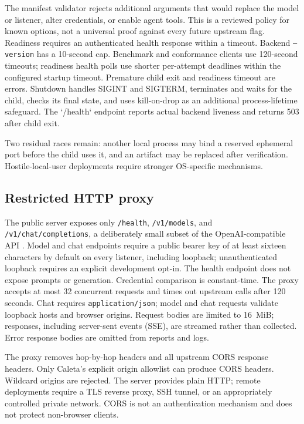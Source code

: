 \documentclass[11pt,a4paper]{article}
\begin{document}
The manifest validator rejects additional arguments that would replace the model or listener, alter credentials, or enable agent tools. This is a reviewed policy for known options, not a universal proof against every future upstream flag. Readiness requires an authenticated health response within a timeout. Backend \texttt{--version} has a 10-second cap. Benchmark and conformance clients use 120-second timeouts; readiness health polls use shorter per-attempt deadlines within the configured startup timeout. Premature child exit and readiness timeout are errors. Shutdown handles SIGINT and SIGTERM, terminates and waits for the child, checks its final state, and uses kill-on-drop as an additional process-lifetime safeguard. The `/health` endpoint reports actual backend liveness and returns 503 after child exit.

Two residual races remain: another local process may bind a reserved ephemeral port before the child uses it, and an artifact may be replaced after verification. Hostile-local-user deployments require stronger OS-specific mechanisms.

\subsection{Restricted HTTP proxy}

The public server exposes only \texttt{/health}, \texttt{/v1/models}, and \texttt{/v1/chat/completions}, a deliberately small subset of the OpenAI-compatible API \cite{openai}. Model and chat endpoints require a public bearer key of at least sixteen characters by default on every listener, including loopback; unauthenticated loopback requires an explicit development opt-in. The health endpoint does not expose prompts or generation. Credential comparison is constant-time. The proxy accepts at most 32 concurrent requests and times out upstream calls after 120 seconds. Chat requires \texttt{application/json}; model and chat requests validate loopback hosts and browser origins. Request bodies are limited to 16~MiB; responses, including server-sent events (SSE), are streamed rather than collected. Error response bodies are omitted from reports and logs.

The proxy removes hop-by-hop headers and all upstream CORS response headers. Only Caleta's explicit origin allowlist can produce CORS headers. Wildcard origins are rejected. The server provides plain HTTP; remote deployments require a TLS reverse proxy, SSH tunnel, or an appropriately controlled private network. CORS is not an authentication mechanism and does not protect non-browser clients.
\end{document}
